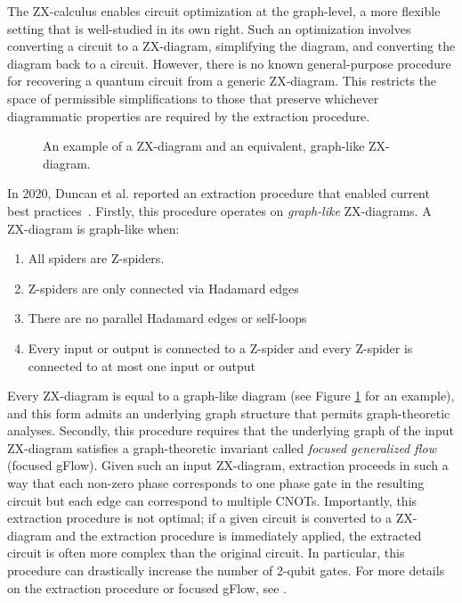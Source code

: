The ZX-calculus enables circuit optimization at the graph-level, a more flexible setting that is well-studied in its own right.
Such an optimization involves converting a circuit to a ZX-diagram, simplifying the diagram, and converting the diagram back to a circuit. %
However, there is no known general-purpose procedure for recovering a quantum circuit from a generic ZX-diagram.
This restricts the space of permissible simplifications to those that preserve whichever diagrammatic properties are required by the extraction procedure.


\begin{figure}
\centering
{}
\caption{An example of a ZX-diagram and an equivalent, graph-like ZX-diagram.}
\label{fig:graph-like}
\end{figure}

In 2020, Duncan et al. reported an extraction procedure that enabled current best practices~\cite{duncan2020graph}.
Firstly, this procedure operates on \emph{graph-like} ZX-diagrams.
A ZX-diagram is graph-like when:
\begin{enumerate}
\item
  All spiders are Z-spiders.
\item
  Z-spiders are only connected via Hadamard edges
\item
  There are no parallel Hadamard edges or self-loops
\item
  Every input or output is connected to a Z-spider and every Z-spider is connected to at most one input or output
\end{enumerate}
Every ZX-diagram is equal to a graph-like diagram (see Figure \ref{fig:graph-like} for an example), and this form admits an underlying graph structure that permits graph-theoretic analyses.
Secondly, this procedure requires that the underlying graph of the input ZX-diagram satisfies a graph-theoretic invariant called \emph{focused generalized flow} (focused gFlow). %
Given such an input ZX-diagram, extraction proceeds in such a way that each non-zero phase corresponds to one phase gate in the resulting circuit but each edge can correspond to multiple CNOTs.
Importantly, this extraction procedure is not optimal;
if a given circuit is converted to a ZX-diagram and the extraction procedure is immediately applied, the extracted circuit is often more complex than the original circuit.
In particular, this procedure can drastically increase the number of 2-qubit gates.
For more details on the extraction procedure or focused gFlow, see \cite{duncan2020graph}.

